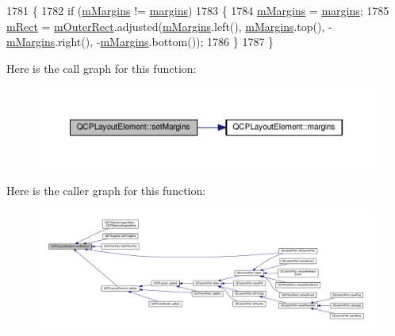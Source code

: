 \begin{DoxyCode}
1781 \{
1782   \textcolor{keywordflow}{if} (\hyperlink{class_q_c_p_layout_element_ac2a32b99ee527ca5dfff9da03628fe94}{mMargins} != \hyperlink{class_q_c_p_layout_element_a85ff977dfcced84eef32d9f819ec9543}{margins})
1783   \{
1784     \hyperlink{class_q_c_p_layout_element_ac2a32b99ee527ca5dfff9da03628fe94}{mMargins} = \hyperlink{class_q_c_p_layout_element_a85ff977dfcced84eef32d9f819ec9543}{margins};
1785     \hyperlink{class_q_c_p_layout_element_ad8896f05550389f7b9e92c9e6cdf6e01}{mRect} = \hyperlink{class_q_c_p_layout_element_a07bb4973379e75cb0fa5b032c1d24afd}{mOuterRect}.adjusted(\hyperlink{class_q_c_p_layout_element_ac2a32b99ee527ca5dfff9da03628fe94}{mMargins}.left(), \hyperlink{class_q_c_p_layout_element_ac2a32b99ee527ca5dfff9da03628fe94}{mMargins}.top(), -
      \hyperlink{class_q_c_p_layout_element_ac2a32b99ee527ca5dfff9da03628fe94}{mMargins}.right(), -\hyperlink{class_q_c_p_layout_element_ac2a32b99ee527ca5dfff9da03628fe94}{mMargins}.bottom());
1786   \}
1787 \}
\end{DoxyCode}


Here is the call graph for this function\+:\nopagebreak
\begin{figure}[H]
\begin{center}
\leavevmode
\includegraphics[width=350pt]{class_q_c_p_layout_element_a8f450b1f3f992ad576fce2c63d8b79cf_cgraph}
\end{center}
\end{figure}




Here is the caller graph for this function\+:\nopagebreak
\begin{figure}[H]
\begin{center}
\leavevmode
\includegraphics[width=350pt]{class_q_c_p_layout_element_a8f450b1f3f992ad576fce2c63d8b79cf_icgraph}
\end{center}
\end{figure}


